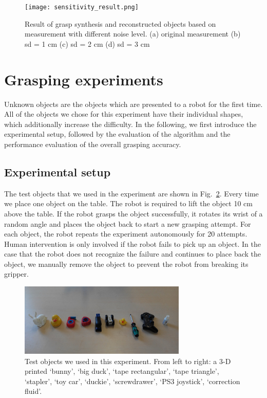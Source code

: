 \begin{figure}[!htbp] 
\centering
\texttt{[image: sensitivity\_result.png]}%
\caption{Result of grasp synthesis and reconstructed objects based on measurement with different noise level. (a) original measurement (b) sd = 1 cm (c) sd = 2 cm (d) sd = 3 cm}
\label{fig:grasp_synthesis_sensitivity}
\end{figure}	



\section{Grasping experiments}
Unknown objects are the objects which are presented to a robot for the first time. All of the objects we chose for this experiment have their individual shapes, which additionally increase the difficulty. In the following, we first introduce the experimental setup, followed by the evaluation of the algorithm and the performance evaluation of the overall grasping accuracy. 

\subsection{Experimental setup}
The test objects that we used in the experiment are shown in Fig.~\ref{fig:test_objects}. Every time we place one object on the table. The robot is required to lift the object 10 cm above the table. If the robot grasps the object successfully, it rotates its wrist of a random angle and places the object back to start a new grasping attempt. For each object, the robot repeats the experiment autonomously for 20 attempts. Human intervention is only involved if the robot fails to pick up an object. In the case that the robot does not recognize the failure and continues to place back the object,  we manually remove the object to prevent the robot from breaking its gripper.  

\begin{figure}[!htbp] 
\centering
\includegraphics[width=0.7\linewidth]
{figure/test_object.png}%
\caption{Test objects we used in this experiment. From left to right: a 3-D printed `bunny', `big duck', `tape rectangular', `tape triangle', `stapler', `toy car', `duckie', `screwdrawer', `PS3 joystick', `correction fluid'. }
\label{fig:test_objects}
\end{figure}	
   
